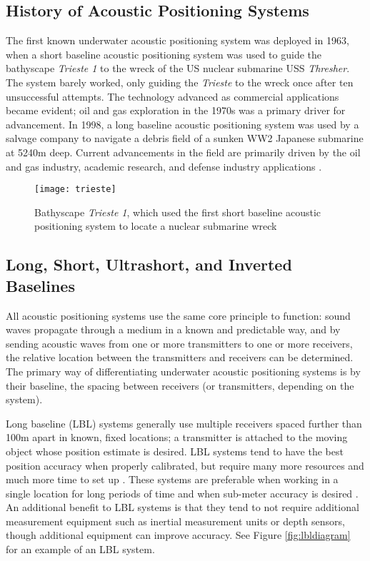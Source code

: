 \documentclass[11pt]{ucthesisCP}
\begin{document}
\subsection{History of Acoustic Positioning Systems} \label{ssec:3s1s1}
The first known underwater acoustic positioning system was deployed in 1963, when a short baseline acoustic positioning system was used to guide the bathyscape \emph{Trieste 1} to the wreck of the US nuclear submarine USS \emph{Thresher}. The system barely worked, only guiding the \textit{Trieste} to the wreck once after ten unsuccessful attempts. The technology advanced as commercial applications became evident; oil and gas exploration in the 1970s was a primary driver for advancement. In 1998, a long baseline acoustic positioning system was used by a salvage company to navigate a debris field of a sunken WW2 Japanese submarine at 5240m deep. Current advancements in the field are primarily driven by the oil and gas industry, academic research, and defense industry applications \cite{apomab}.

\begin{figure}[htbp]
	\centering
	\texttt{[image: trieste]}
	\caption{Bathyscape \textit{Trieste 1}, which used the first short baseline acoustic positioning system to locate a nuclear submarine wreck \cite{apomab}}
	\label{fig:trieste}
\end{figure}

\subsection{Long, Short, Ultrashort, and Inverted Baselines} \label{ssec:3s1s2}
All acoustic positioning systems use the same core principle to function: sound waves propagate through a medium in a known and predictable way, and by sending acoustic waves from one or more transmitters to one or more receivers, the relative location between the transmitters and receivers can be determined. The primary way of differentiating underwater acoustic positioning systems is by their baseline, the spacing between receivers (or transmitters, depending on the system).

Long baseline (LBL) systems generally use multiple receivers spaced further than 100m apart in known, fixed locations; a transmitter is attached to the moving object whose position estimate is desired. LBL systems tend to have the best position accuracy when properly calibrated, but require many more resources and much more time to set up \cite{practicaloverview}. These systems are preferable when working in a single location for long periods of time and when sub-meter accuracy is desired \cite{apomab}. An additional benefit to LBL systems is that they tend to not require additional measurement equipment such as inertial measurement units or depth sensors, though additional equipment can improve accuracy. See Figure \ref{fig:lbldiagram} for an example of an LBL system.
\end{document}
